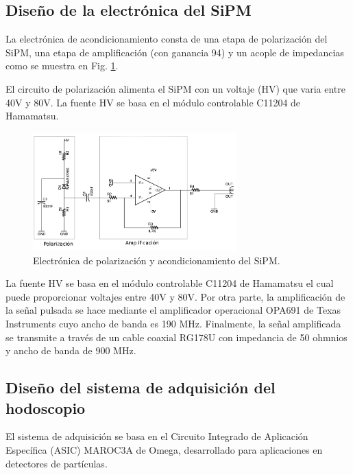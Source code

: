 \subsection{Diseño de la electrónica del SiPM}

 La electrónica de acondicionamiento consta de una etapa de polarización del SiPM, una etapa de amplificación (con ganancia 94) y un acople de impedancias como se muestra en Fig. \ref{SiPM_Ele}. 
 
 El circuito de polarización alimenta el SiPM con un voltaje (HV) que varia entre 40V y 80V. La fuente HV se basa en el módulo controlable C11204 de Hamamatsu.
 
 \begin{figure}[h!]
\begin{center}
\includegraphics[width=0.7\textwidth]{Figures/Acondicionamiento.png}
\caption{Electrónica de polarización y acondicionamiento del SiPM.}
\label{SiPM_Ele}
\end{center}
\end{figure}

La fuente HV se basa en el módulo controlable C11204 de Hamamatsu el cual puede proporcionar voltajes entre 40V y 80V. Por otra parte, la amplificación de la señal pulsada se hace mediante el amplificador operacional OPA691 de Texas Instruments cuyo ancho de banda es 190 MHz. Finalmente, la señal amplificada se transmite a través de un cable coaxial RG178U con impedancia de 50 ohmnios y ancho de banda de 900 MHz.

\subsection{Diseño del sistema de adquisición del hodoscopio}

El sistema de adquisición se basa en el Circuito Integrado de Aplicación Específica (ASIC) MAROC3A de Omega, desarrollado para aplicaciones en detectores de partículas.

